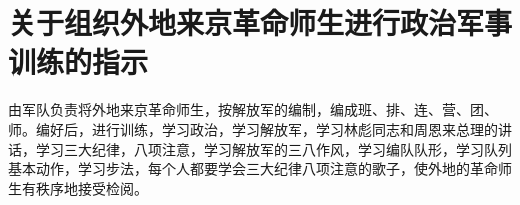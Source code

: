 \section[关于组织外地来京革命师生进行政治军事训练的指示（一九六六年十月）]{关于组织外地来京革命师生进行政治军事训练的指示}


由军队负责将外地来京革命师生，按解放军的编制，编成班、排、连、营、团、师。编好后，进行训练，学习政治，学习解放军，学习林彪同志和周恩来总理的讲话，学习三大纪律，八项注意，学习解放军的三八作风，学习编队队形，学习队列基本动作，学习步法，每个人都要学会三大纪律八项注意的歌子，使外地的革命师生有秩序地接受检阅。


